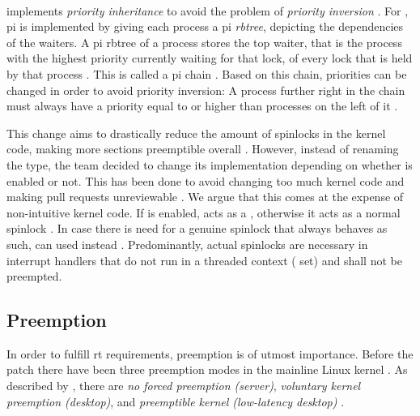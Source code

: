 \documentclass[10pt,twocolumn,a4paper]{article}
\begin{document}
\paragraph{} implements \emph{priority inheritance} to avoid the problem of \emph{priority inversion} \cite{rostedt_rtmutex_2017}.
For , \acrfull{pi} is implemented by giving each process a \acrshort{pi} \emph{rbtree}, depicting the dependencies of the waiters.
A \acrshort{pi} rbtree of a process stores the top waiter, that is the process with the highest priority currently waiting for that lock, of every lock that is held by that process \cite{rostedt_rtmutex_2017}.
This is called a \acrshort{pi} chain \cite{rostedt_rtmutex_2017}.
Based on this chain, priorities can be changed in order to avoid priority inversion:
A process further right in the chain must always have a priority equal to or higher than processes on the left of it \cite{rostedt_rtmutex_2017}.
\newline

\noindent This change aims to drastically reduce the amount of spinlocks in the kernel code, making more sections preemptible overall \cite{lf:sleeping-spinlocks}.
However, instead of renaming the type, the team decided to change its implementation depending on whether  is enabled or not.
This has been done to avoid changing too much kernel code and making pull requests unreviewable \cite{reghenzani_realtime_2019}.
We argue that this comes at the expense of non-intuitive kernel code.
If  is enabled,  acts as a , otherwise it acts as a normal spinlock \cite{mckenney_realtime_2005}.
In case there is need for a genuine spinlock that always behaves as such,  can used instead \cite{mckenney_realtime_2005, chyyuu_github_2017}.
Predominantly, actual spinlocks are necessary in interrupt handlers that do not run in a threaded context ( set) and shall not be preempted.


\subsection{Preemption}\label{subsec:preemption}
In order to fulfill \acrshort{rt} requirements, preemption is of utmost importance.
Before the  patch there have been three preemption modes in the mainline Linux kernel \cite{lf:preemption}.
As described by \citeauthor{lf:preemption}, there are \emph{no forced preemption (server)}, \emph{voluntary kernel preemption (desktop)}, and \emph{preemptible kernel (low-latency desktop)} \cite{lf:preemption}.
\end{document}

